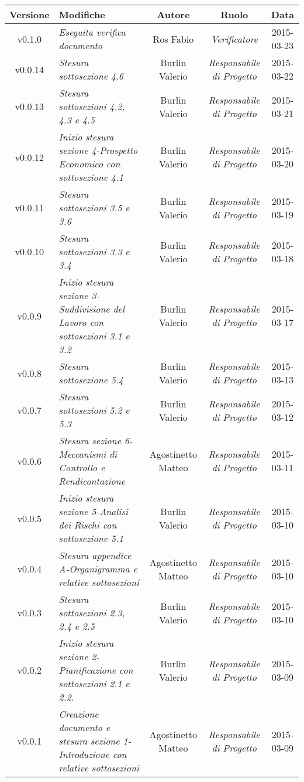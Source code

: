 \newpage

\begin{table}[h]
\centering
\begin{tabular}{|c|p{}|c|c|c|}
	\toprule
		\textbf{Versione} & \textbf{Modifiche} & \textbf{Autore} & \textbf{Ruolo} & \textbf{Data}\\
	\midrule
	\midrule
		v0.1.0 & \textit{Eseguita verifica documento} & Ros Fabio & \textit{Verificatore} & 2015-03-23\\
	\midrule
		v0.0.14 & \textit{Stesura sottosezione 4.6} & Burlin Valerio & \textit{Responsabile di Progetto} & 2015-03-22\\
	\midrule
		v0.0.13 & \textit{Stesura sottosezioni 4.2, 4.3 e 4.5} & Burlin Valerio & \textit{Responsabile di Progetto} & 2015-03-21\\
	\midrule
		v0.0.12 & \textit{Inizio stesura sezione 4-Prospetto Economico con sottosezione 4.1} & Burlin Valerio & \textit{Responsabile di Progetto} & 2015-03-20\\
	\midrule
		v0.0.11 & \textit{Stesura sottosezioni 3.5 e 3.6} & Burlin Valerio & \textit{Responsabile di Progetto} & 2015-03-19\\
	\midrule
		v0.0.10 & \textit{Stesura sottosezioni 3.3 e 3.4} & Burlin Valerio & \textit{Responsabile di Progetto} & 2015-03-18\\
	\midrule
		v0.0.9 & \textit{Inizio stesura sezione 3-Suddivisione del Lavoro con sottosezioni 3.1 e 3.2} & Burlin Valerio & \textit{Responsabile di Progetto} & 2015-03-17\\
	\midrule
		v0.0.8 & \textit{Stesura sottosezione 5.4} & Burlin Valerio & \textit{Responsabile di Progetto} & 2015-03-13\\
	\midrule
		v0.0.7 & \textit{Stesura sottosezioni 5.2 e 5.3} & Burlin Valerio & \textit{Responsabile di Progetto} & 2015-03-12\\
	\midrule
		v0.0.6 & \textit{Stesura sezione 6-Meccanismi di Controllo e Rendicontazione} & Agostinetto Matteo & \textit{Responsabile di Progetto} & 2015-03-11\\
	\midrule
		v0.0.5 & \textit{Inizio stesura sezione 5-Analisi dei Rischi con sottosezione 5.1} & Burlin Valerio & \textit{Responsabile di Progetto} & 2015-03-10\\
	\midrule
		v0.0.4 & \textit{Stesura appendice A-Organigramma e relative sottosezioni} & Agostinetto Matteo & \textit{Responsabile di Progetto} & 2015-03-10\\
	\midrule
		v0.0.3 & \textit{Stesura sottosezioni 2.3, 2.4 e 2.5} & Burlin Valerio & \textit{Responsabile di Progetto} & 2015-03-10\\
	\midrule
		v0.0.2 & \textit{Inizio stesura sezione 2-Pianificazione con sottosezioni 2.1 e 2.2.} & Burlin Valerio & \textit{Responsabile di Progetto} & 2015-03-09\\
	\midrule
		v0.0.1 & \textit{Creazione documento e stesura sezione 1-Introduzione con relative sottosezioni} & Agostinetto Matteo & \textit{Responsabile di Progetto} & 2015-03-09\\	
	\bottomrule
\end{tabular}
\end{table}

\newpage
